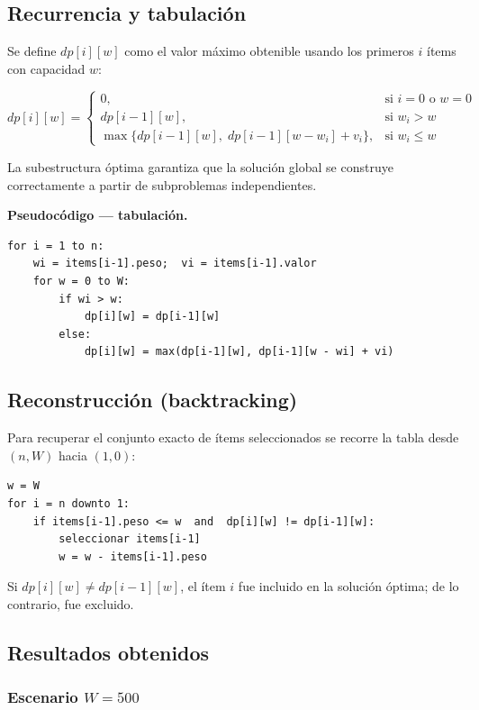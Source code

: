 \documentclass[12pt, a4paper]{article}
\begin{document}
\subsection{Recurrencia y tabulación}

Se define $dp[i][w]$ como el valor máximo obtenible usando los primeros $i$ ítems con capacidad $w$:

\[
dp[i][w] =
\begin{cases}
  0, & \text{si } i = 0 \text{ o } w = 0 \\[3pt]
  dp[i-1][w], & \text{si } w_i > w \\[3pt]
  \max\!\bigl\{dp[i-1][w],\; dp[i-1][w - w_i] + v_i\bigr\}, & \text{si } w_i \leq w
\end{cases}
\]

La subestructura óptima garantiza que la solución global se construye correctamente a partir de subproblemas independientes.


\textbf{Pseudocódigo — tabulación.}
\begin{lstlisting}
for i = 1 to n:
    wi = items[i-1].peso;  vi = items[i-1].valor
    for w = 0 to W:
        if wi > w:
            dp[i][w] = dp[i-1][w]
        else:
            dp[i][w] = max(dp[i-1][w], dp[i-1][w - wi] + vi)
\end{lstlisting}

\subsection{Reconstrucción (backtracking)}

Para recuperar el conjunto exacto de ítems seleccionados se recorre la tabla desde $(n, W)$ hacia $(1, 0)$:

\begin{lstlisting}
w = W
for i = n downto 1:
    if items[i-1].peso <= w  and  dp[i][w] != dp[i-1][w]:
        seleccionar items[i-1]
        w = w - items[i-1].peso
\end{lstlisting}

Si $dp[i][w] \neq dp[i-1][w]$, el ítem $i$ fue incluido en la solución óptima; de lo contrario, fue excluido.

\subsection{Resultados obtenidos}

\subsubsection*{Escenario $W = 500$}
\end{document}
